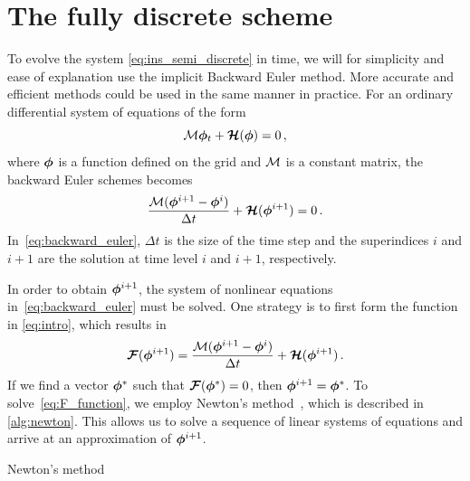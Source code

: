 \section{The fully discrete scheme}%
\label{sec:fully_discrete}
To evolve the system \eqref{eq:ins_semi_discrete} in time, we will for simplicity and ease of explanation use the implicit Backward Euler method. More accurate and efficient methods could be used in the same manner in practice.  For an ordinary differential system of equations of the form
\begin{equation*}
 \mathcal{M} \bm{\phi}_t + \bm{\mathcal{H}}(\bm{\phi}) = 0
 \, ,
\end{equation*}
where $\bm{\phi}$ is a function defined on the grid and $\mathcal{M}$ is a constant matrix, the backward Euler schemes becomes 
\begin{equation}
  \frac{\Mn (\soln^{i+1} - \soln^i)}{\Delta t} + \Hn(\soln^{i+1}) = 0
  \,.
  \label{eq:backward_euler}
\end{equation}
In~\eqref{eq:backward_euler}, $\Delta t$ is the size of the time step and the superindices $i$ and $i+1$ are the solution at time level $i$ and $i+1$, respectively.

In order to obtain $\bm{\phi}^{i+1}$, the system of nonlinear equations in~\eqref{eq:backward_euler} must be solved. One strategy is to first form the function in \eqref{eq:intro}, which results in
\begin{equation}
  \Fn(\soln^{i+1}) = 
  \frac{\Mn (\soln^{i+1} - \soln^i)}{\Delta t} + \Hn(\soln^{i+1})
  \,.
  \label{eq:F_function}
\end{equation}
If we find a vector $\bm{\phi}^*$ such that $\bm{\mathcal{F}}(\bm{\phi}^*) = 0$, then $\bm{\phi}^{i+1} = \bm{\phi}^*$. To solve~\eqref{eq:F_function}, we employ Newton's method~\cite{quarteroni2010numerical}, which is described in \cref{alg:newton}. This allows us to solve a sequence of linear systems of equations and arrive at an approximation of $\bm{\phi}^{i+1}$.
\begin{algorithm}
\caption{Newton's method}
\label{alg:newton}
\begin{algorithmic}
\ENDFOR
\end{algorithmic}
\end{algorithm}

